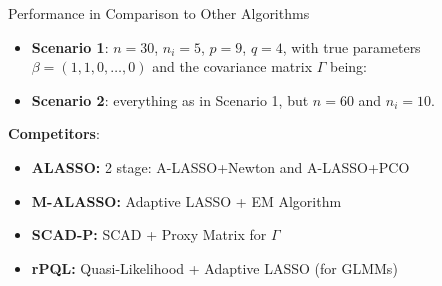 \documentclass[8pt]{beamer}
\begin{document}
\begin{frame}{Performance in Comparison to Other Algorithms}
\begin{itemize}
	\item \textbf{Scenario 1}: $n=30$, $n_i=5$, $p = 9$, $q = 4$, with true parameters $\beta = (1, 1, 0, \dots, 0)$ and the covariance matrix $\Gamma$ being: 
	\item \textbf{Scenario 2}: everything as in Scenario 1, but $n=60$ and $n_i=10$.
\end{itemize}
\textbf{Competitors}:
\begin{itemize}
	\item \textbf{ALASSO:} 2 stage: A-LASSO+Newton and A-LASSO+PCO
	\item \textbf{M-ALASSO:} Adaptive LASSO + EM Algorithm
	\item \textbf{SCAD-P:} SCAD + Proxy Matrix for $\Gamma$
	\item \textbf{rPQL:} Quasi-Likelihood + Adaptive LASSO (for GLMMs)
\end{itemize}
\end{frame}
\end{document}
